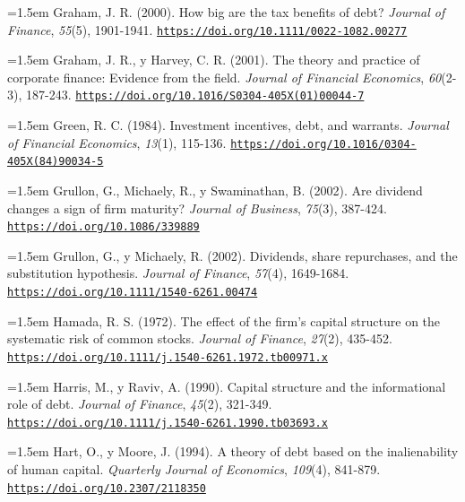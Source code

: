 \documentclass[10pt,a4paper]{article}
\begin{document}
\noindent\hangindent=1.5em Graham, J. R. (2000). How big are the tax benefits of debt? \textit{Journal of Finance}, \textit{55}(5), 1901-1941. \href{https://doi.org/10.1111/0022-1082.00277}{\nolinkurl{https://doi.org/10.1111/0022-1082.00277}}

\noindent\hangindent=1.5em Graham, J. R., y Harvey, C. R. (2001). The theory and practice of corporate finance: Evidence from the field. \textit{Journal of Financial Economics}, \textit{60}(2-3), 187-243. \href{https://doi.org/10.1016/S0304-405X(01)00044-7}{\nolinkurl{https://doi.org/10.1016/S0304-405X(01)00044-7}}

\noindent\hangindent=1.5em Green, R. C. (1984). Investment incentives, debt, and warrants. \textit{Journal of Financial Economics}, \textit{13}(1), 115-136. \href{https://doi.org/10.1016/0304-405X(84)90034-5}{\nolinkurl{https://doi.org/10.1016/0304-405X(84)90034-5}}

\noindent\hangindent=1.5em Grullon, G., Michaely, R., y Swaminathan, B. (2002). Are dividend changes a sign of firm maturity? \textit{Journal of Business}, \textit{75}(3), 387-424. \href{https://doi.org/10.1086/339889}{\nolinkurl{https://doi.org/10.1086/339889}}

\noindent\hangindent=1.5em Grullon, G., y Michaely, R. (2002). Dividends, share repurchases, and the substitution hypothesis. \textit{Journal of Finance}, \textit{57}(4), 1649-1684. \href{https://doi.org/10.1111/1540-6261.00474}{\nolinkurl{https://doi.org/10.1111/1540-6261.00474}}

\noindent\hangindent=1.5em Hamada, R. S. (1972). The effect of the firm's capital structure on the systematic risk of common stocks. \textit{Journal of Finance}, \textit{27}(2), 435-452. \href{https://doi.org/10.1111/j.1540-6261.1972.tb00971.x}{\nolinkurl{https://doi.org/10.1111/j.1540-6261.1972.tb00971.x}}

\noindent\hangindent=1.5em Harris, M., y Raviv, A. (1990). Capital structure and the informational role of debt. \textit{Journal of Finance}, \textit{45}(2), 321-349. \href{https://doi.org/10.1111/j.1540-6261.1990.tb03693.x}{\nolinkurl{https://doi.org/10.1111/j.1540-6261.1990.tb03693.x}}

\noindent\hangindent=1.5em Hart, O., y Moore, J. (1994). A theory of debt based on the inalienability of human capital. \textit{Quarterly Journal of Economics}, \textit{109}(4), 841-879. \href{https://doi.org/10.2307/2118350}{\nolinkurl{https://doi.org/10.2307/2118350}}
\end{document}
